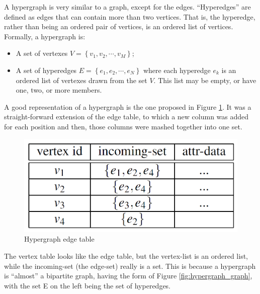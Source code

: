 A hypergraph is very similar to a graph, except for the edges. 
\enquote{Hyperedges} are defined as edges that can contain more than two vertices. That is, the hyperedge, rather than being an ordered pair of vertices, is an ordered list of vertices. \\
Formally, a hypergraph is:
\begin{itemize}
	\item A set of vertexes $V=\left\{v_{1}, v_{2}, \cdots, v_{M}\right\}$;
	\item A set of hyperedges $E=\left\{e_{1}, e_{2}, \cdots, e_{N}\right\}$ where each hyperedge $e_{k}$ is an ordered list of vertexes drawn from the set $V$. This list may be empty, or have one, two, or more members.
\end{itemize}

A good representation of a hypergraph is the one proposed in Figure \ref{fig:atomspace_table}. 
It was a straight-forward extension of the edge table, to which a new column was added for each position and then, those columns were mashed together into one set.  

\begin{figure} [h]
\centering
\includegraphics[width=0.7
\textwidth]{figures/Magistrale/atomspace_table}
\caption[Hypergraph edge table]{Hypergraph edge table
\label{fig:atomspace_table}}
\end{figure}

The vertex table looks like the edge table, but the vertex-list is an ordered list, while the incoming-set (the edge-set) really is a set. This is because a hypergraph is “almost” a bipartite graph, having the form of Figure \ref{fig:hypergraph_graph}, with the set E on the left being the set of hyperedges. \\

